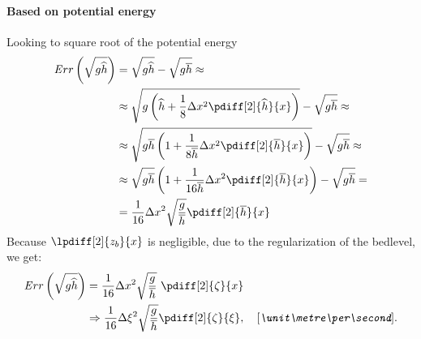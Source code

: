 \paragraph*{Based on potential energy}
Looking to square root of the potential energy
\begin{align}
    {\mathit Err}\left(\sqrt{g\hhat}\right) & = \sqrt{g\hhat} - \sqrt{g\hbar} \approx
    \\
    & \approx \sqrt{g\left(\hhat + \frac{1}{8}\Dx^2\pdiff[2]{\hhat}{x}\right)} - \sqrt{g\hbar} \approx
    \\
    & \approx \sqrt{g\hbar\left(1 + \frac{1}{8\hbar}\Dx^2\pdiff[2]{\hbar}{x}\right)} - \sqrt{g\hbar} \approx
    \\
    &\approx \sqrt{g\hbar}\left(1 + \frac{1}{16\hbar}\Dx^2 \pdiff[2]{\hbar}{x}\right) - \sqrt{g\hbar} =
    \\
    & = \frac{1}{16} \Dx^2 \sqrt{\frac{g}{\hbar}}\pdiff[2]{\hbar}{x}
\end{align}
Because $\lpdiff[2]{z_b}{x}$ is negligible, due to the regularization of the bedlevel, we get:
\begin{align}
    {\mathit Err}\left(\sqrt{g\hhat}\right)  & = \frac{1}{16} \Dx^2 \sqrt{\frac{g}{\hbar}}\ \pdiff[2]{\zeta}{x}
    \\
    & \Rightarrow \frac{1}{16} \Dxi^2 \sqrt{\frac{g}{\hbar}}\pdiff[2]{\zeta}{\xi}, \quad \bunit{\metre\per\second}.
\end{align}
\phantom{text}
%
